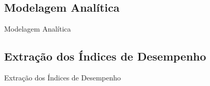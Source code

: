 \documentclass[xcolor=x11names,compress]{beamer}
\renewcommand{\(}{\begin{columns}}
\renewcommand{\)}{\end{columns}}
\newcommand{\<}[1]{\begin{column}{#1}}
\renewcommand{\>}{\end{column}}
\begin{document}
    \subsection{Modelagem Analítica}
        \begin{frame}{Modelagem Analítica}

        \end{frame}

    \subsection{Extração dos Índices de Desempenho}
        \begin{frame}{Extração dos Índices de Desempenho}

        \end{frame}
\end{document}

